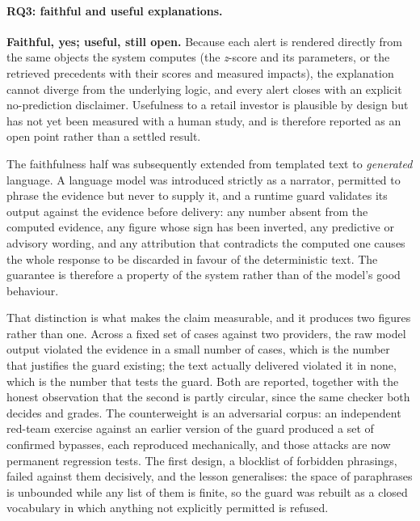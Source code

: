 \paragraph{RQ3: faithful and useful explanations.}
\textbf{Faithful, yes; useful, still open.} Because each alert is rendered directly from the same objects the system
computes (the \emph{z}-score and its parameters, or the retrieved precedents with their scores and
measured impacts), the explanation cannot diverge from the underlying logic, and every alert closes with
an explicit no-prediction disclaimer. Usefulness to a retail investor is plausible by design but has not
yet been measured with a human study, and is therefore reported as an open point rather than a settled
result.

The faithfulness half was subsequently extended from templated text to \emph{generated} language.
A language model was introduced strictly as a narrator, permitted to phrase the evidence but never
to supply it, and a runtime guard validates its output against the evidence before delivery: any
number absent from the computed evidence, any figure whose sign has been inverted, any predictive or
advisory wording, and any attribution that contradicts the computed one causes the whole response to
be discarded in favour of the deterministic text. The guarantee is therefore a property of the
system rather than of the model's good behaviour.

That distinction is what makes the claim measurable, and it produces two figures rather than one.
Across a fixed set of cases against two providers, the raw model output violated the evidence in a
small number of cases, which is the number that justifies the guard existing; the text actually
delivered violated it in none, which is the number that tests the guard. Both are reported, together
with the honest observation that the second is partly circular, since the same checker both decides
and grades. The counterweight is an adversarial corpus: an independent red-team exercise against an
earlier version of the guard produced a set of confirmed bypasses, each reproduced mechanically, and
those attacks are now permanent regression tests. The first design, a blocklist of forbidden
phrasings, failed against them decisively, and the lesson generalises: the space of paraphrases is
unbounded while any list of them is finite, so the guard was rebuilt as a closed vocabulary in which
anything not explicitly permitted is refused.

